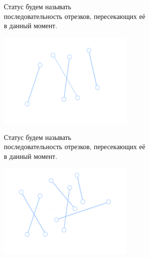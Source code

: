 \begin{frame}{Статус}
        \vphantom{x}{\it Статусом заметающей прямой} будем называть\\
        последовательность отрезков, пересекающих её\\
        в данный момент.

        \begin{center}
        \includegraphics[width=0.5\textwidth]{картинки/нормкартинки/sweepline2.pdf}
	\end{center}
\end{frame}

\begin{frame}{Статус}
        \vphantom{x}{\it Статусом заметающей прямой} будем называть\\
        последовательность отрезков, пересекающих её\\
        в данный момент.

        \begin{center}
        \includegraphics[width=0.5\textwidth]{картинки/нормкартинки/sweepline3.pdf}
	\end{center}
\end{frame}

